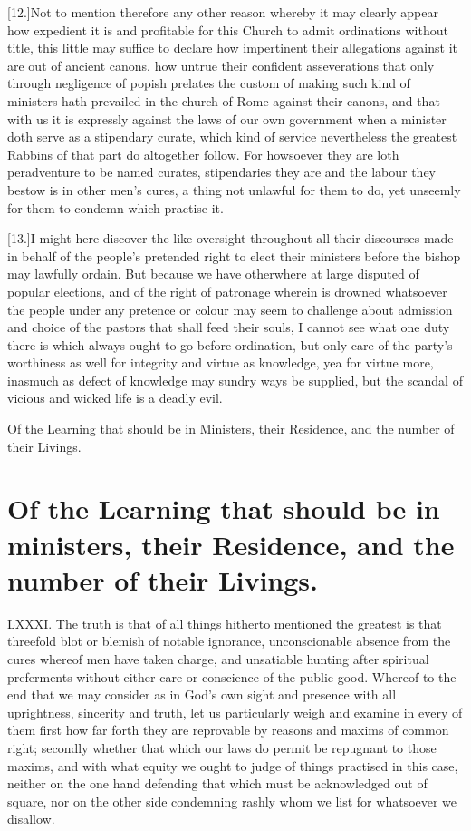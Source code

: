 [12.]Not to mention therefore any other reason whereby it may clearly appear how expedient it is and profitable for this Church to admit ordinations without title, this little may suffice to declare how impertinent their allegations against it are out of ancient canons, how untrue their confident asseverations that only through negligence of popish prelates the custom of making such kind of ministers hath prevailed in the church of Rome against their canons, and that with us it is expressly against the laws of our own government when a minister doth serve as a stipendary curate, which kind of service nevertheless the greatest Rabbins of that part do altogether follow. For howsoever they are loth peradventure to be named curates, stipendaries they are and the labour they bestow is in other men’s cures, a thing not unlawful for them to do, yet unseemly for them to condemn which practise it.

[13.]I might here discover the like oversight throughout all their discourses made in behalf of the people’s pretended right to elect their ministers before the bishop may lawfully ordain. But because we have otherwhere at large disputed of popular elections, and of the right of patronage wherein is drowned whatsoever the people under any pretence or colour  may seem to challenge about admission and choice of the pastors that shall feed their souls,
 I cannot see what one duty there is which always ought to go before ordination, but only care of the party’s worthiness as well for integrity and virtue as knowledge, yea for virtue more, inasmuch as defect of knowledge may sundry ways be supplied, but the scandal of vicious and wicked life is a deadly evil.


Of the Learning that should be in Ministers, their Residence, and the number of their Livings.
\section*{Of the Learning that should be in ministers, their Residence, and the number of their Livings.}
LXXXI. The truth is that of all things hitherto mentioned the greatest is that threefold blot or blemish of notable ignorance, unconscionable absence from the cures whereof men have taken charge, and unsatiable hunting after spiritual preferments without either care or conscience of the public good. Whereof to the end that we may consider as in God’s own sight and presence with all uprightness, sincerity and truth, let us particularly weigh and examine in every of them first how far forth they are reprovable by reasons and maxims of common right; secondly whether that which our laws do permit be repugnant to those maxims, and with what equity we ought to judge of things practised in this case, neither on the one hand defending that which must be acknowledged out of square, nor on the other side condemning rashly whom we list for whatsoever we disallow.

